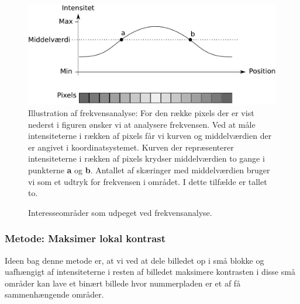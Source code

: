 \begin{figure}[htp]
  \centering
  \includegraphics[width=12cm]{system/illu/frekvensanalyse.pdf}  
  \caption{Illustration af frekvensanalyse: For den række pixels der er vist nederst i figuren ønsker vi at analysere frekvensen. Ved at måle intensiteterne i rækken af pixels får vi kurven og middelværdien der er angivet i koordinatsystemet. Kurven der repræsenterer intensiteterne i rækken af pixels krydser middelværdien to gange i punkterne \textbf{a} og \textbf{b}. Antallet af skæringer med middelværdien bruger vi som et udtryk for frekvensen i området. I dette tilfælde er tallet to.}
  \label{fig:DetectPlateness-frekvensanalyse}
\end{figure}

\begin{figure}[htp]
  \centering
  \caption{Interesseområder som udpeget ved frekvensanalyse.}
  \label{fig:DetectPlateness-binary}
\end{figure}

\subsubsection{Metode: Maksimer lokal kontrast}
\label{sec:DetectContrastStretch}
Ideen bag denne metode er, at vi ved at dele billedet op i små blokke og uafhængigt af intensiteterne i resten af billedet maksimere kontrasten i disse små områder kan lave et binært billede hvor nummerpladen er et af få sammenhængende områder.


